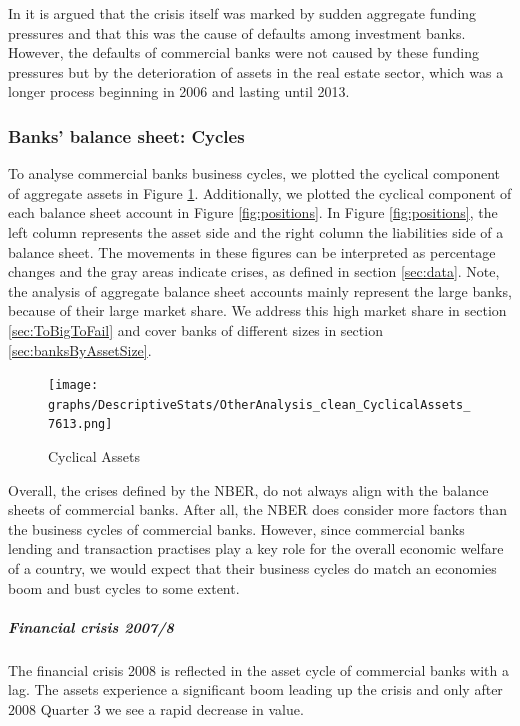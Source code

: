 \documentclass[12pt, a4paper]{article} %
\begin{document}
In \citet{antoniades2019commercial} it is argued that the crisis itself was marked by sudden aggregate funding pressures and that this was the cause of defaults among investment banks. However, the defaults of commercial banks were not caused by these funding pressures but by the deterioration of assets in the real estate sector, which was a longer process beginning in 2006 and lasting until 2013.
\fi




\subsubsection{Banks' balance sheet: Cycles}

To analyse commercial banks business cycles, we plotted the cyclical component of aggregate assets in Figure \ref{fig:cyclial_assets}. Additionally, we plotted the cyclical component of each balance sheet account in Figure \ref{fig:positions}. In Figure \ref{fig:positions}, the left column represents the asset side and the right column the liabilities side of a balance sheet. The movements in these figures can be interpreted as percentage changes and the gray areas indicate crises, as defined in section \ref{sec:data}. Note, the analysis of aggregate balance sheet accounts mainly represent the large banks, because of their large market share. We address this high market share in section \ref{sec:ToBigToFail} and cover banks of different sizes in section \ref{sec:banksByAssetSize}.

\begin{figure}[H]
\begin{minipage}{\textwidth}
\texttt{[image: graphs/DescriptiveStats/OtherAnalysis\_clean\_CyclicalAssets\_7613.png]}
\caption[1]{Cyclical Assets}
\label{fig:cyclial_assets}
\end{minipage}
\end{figure}

Overall, the crises defined by the NBER, do not always align with the balance sheets of commercial banks. After all, the NBER does consider more factors than the business cycles of commercial banks. However, since commercial banks lending and transaction practises play a key role for the overall economic welfare of a country, we would expect that their business cycles do match an economies boom and bust cycles to some extent.


\subparagraph{Financial crisis 2007/8}
The financial crisis 2008 is reflected in the asset cycle of commercial banks with a lag. The assets experience a significant boom leading up the crisis and only after $2008$ Quarter 3 we see a rapid decrease in value.
\end{document}
